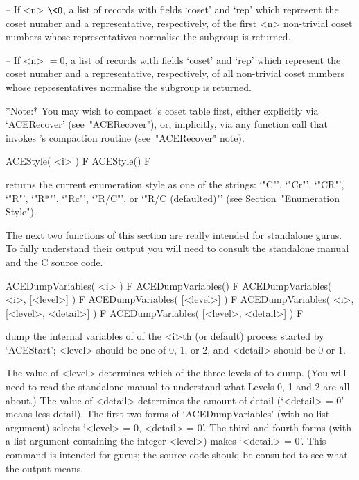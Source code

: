 \item{--} If <n> $\< 0$, a list of records  with  fields  `coset'  and
`rep'  which  represent  the  coset  number  and   a   representative,
respectively,  of  the  first  <n>  non-trivial  coset  numbers  whose
representatives normalise the subgroup is returned.

\item{--} If <n> $= 0$, a list of  records  with  fields  `coset'  and
`rep'  which  represent  the  coset  number  and   a   representative,
respectively, of all non-trivial coset numbers  whose  representatives
normalise the subgroup is returned.

\endlist

*Note:*
You may wish to compact {\ACE}'s coset table first, either  explicitly
via `ACERecover' (see~"ACERecover"), or, implicitly, via any  function
call that invokes {\ACE}'s compaction routine (see~"ACERecover" note).

\>ACEStyle( <i> ) F
\>ACEStyle() F

returns the current enumeration style as one of  the  strings:  `"C"',
`"Cr"', `"CR"', `"R"', `"R*"', `"Rc"', `"R/C"', or `"R/C (defaulted)"'
(see Section~"Enumeration Style").

The next two functions of this section are really intended for  {\ACE}
standalone gurus. To fully understand their output you  will  need  to
consult the standalone manual and the C source code.

\>ACEDumpVariables( <i> ) F
\>ACEDumpVariables() F
\>ACEDumpVariables( <i>, [<level>] ) F
\>ACEDumpVariables( [<level>] ) F
\>ACEDumpVariables( <i>, [<level>, <detail>] ) F
\>ACEDumpVariables( [<level>, <detail>] ) F

dump the internal variables  of  {\ACE}  of  the  <i>th  (or  default)
process started by `ACEStart'; <level> should be one of 0,  1,  or  2,
and <detail> should be 0 or 1.

The value of <level> determines which of the three levels of {\ACE} to
dump. (You will need to read the standalone manual to understand  what
Levels 0, 1 and 2 are all about.) The value of <detail> determines the
amount of detail (`<detail> = 0' means less  detail).  The  first  two
forms of `ACEDumpVariables' (with no list argument) selects `<level> =
0, <detail> = 0'. The third and fourth forms  (with  a  list  argument
containing the integer <level>) makes `<detail> = 0'. This command  is
intended for gurus; the source code should be consulted  to  see  what
the output means.

